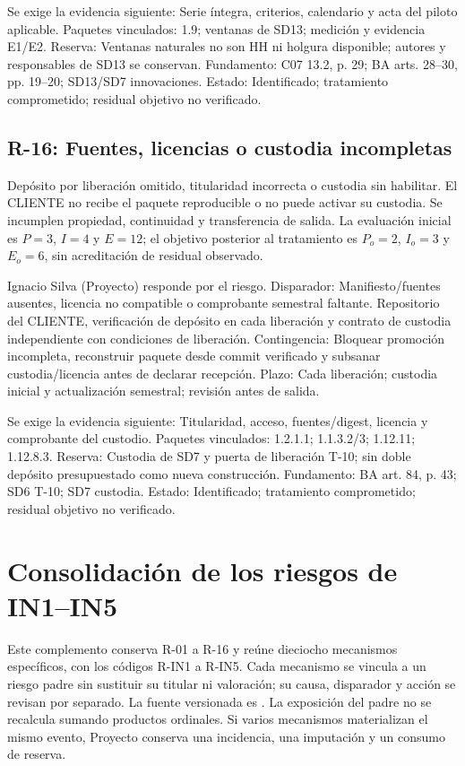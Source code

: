 Se exige la evidencia siguiente: Serie íntegra, criterios, calendario y acta del piloto aplicable. Paquetes vinculados: 1.9; ventanas de SD13; medición y evidencia E1/E2. Reserva: Ventanas naturales no son HH ni holgura disponible; autores y responsables de SD13 se conservan. Fundamento: C07 13.2, p. 29; BA arts. 28–30, pp. 19–20; SD13/SD7 innovaciones. Estado: Identificado; tratamiento comprometido; residual objetivo no verificado. \parencites[numeral 13.2, p.~29]{sd8-c07}[arts.~28--30, pp.~19--20]{sd8-ba}

\subsection{R-16: Fuentes, licencias o custodia incompletas}
Depósito por liberación omitido, titularidad incorrecta o custodia sin habilitar. El CLIENTE no recibe el paquete reproducible o no puede activar su custodia. Se incumplen propiedad, continuidad y transferencia de salida. La evaluación inicial es $P=3$, $I=4$ y $E=12$; el objetivo posterior al tratamiento es $P_o=2$, $I_o=3$ y $E_o=6$, sin acreditación de residual observado.

Ignacio Silva (Proyecto) responde por el riesgo. Disparador: Manifiesto/fuentes ausentes, licencia no compatible o comprobante semestral faltante. Repositorio del CLIENTE, verificación de depósito en cada liberación y contrato de custodia independiente con condiciones de liberación. Contingencia: Bloquear promoción incompleta, reconstruir paquete desde commit verificado y subsanar custodia/licencia antes de declarar recepción. Plazo: Cada liberación; custodia inicial y actualización semestral; revisión antes de salida.

Se exige la evidencia siguiente: Titularidad, acceso, fuentes/digest, licencia y comprobante del custodio. Paquetes vinculados: 1.2.1.1; 1.1.3.2/3; 1.12.11; 1.12.8.3. Reserva: Custodia de SD7 y puerta de liberación T-10; sin doble depósito presupuestado como nueva construcción. Fundamento: BA art. 84, p. 43; SD6 T-10; SD7 custodia. Estado: Identificado; tratamiento comprometido; residual objetivo no verificado. \parencite[art.~84, p.~43]{sd8-ba}

\section{Consolidación de los riesgos de IN1--IN5}\label{sec:t16-innovaciones}
Este complemento conserva R-01 a R-16 y reúne dieciocho mecanismos específicos, con los códigos R-IN1 a R-IN5. Cada mecanismo se vincula a un riesgo padre sin sustituir su titular ni valoración; su causa, disparador y acción se revisan por separado. La fuente versionada es . La exposición del padre no se recalcula sumando productos ordinales. Si varios mecanismos materializan el mismo evento, Proyecto conserva una incidencia, una imputación y un consumo de reserva.

